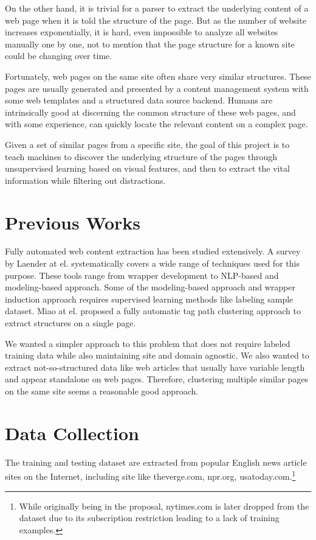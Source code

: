 \documentclass{acm_proc_article-sp}
\begin{document}
On the other hand, it is trivial for a parser to extract the underlying content of a web page when it is told the structure of the page. But as the number of website increases exponentially, it is hard, even impossible to analyze all websites manually one by one, not to mention that the page structure for a known site could be changing over time. 

Fortunately, web pages on the same site often share very similar structures. These pages are usually generated and presented by a content management system with some web templates and a structured data source backend. Humans are intrinsically good at discerning the common structure of these web pages, and with some experience, can quickly locate the relevant content on a complex page.

Given a set of similar pages from a specific site, the goal of this project is to teach machines to discover the underlying structure of the pages through unsupervised learning based on visual features, and then to extract the vital information while filtering out distractions.

\section{Previous Works}

Fully automated web content extraction has been studied extensively. A survey by Laender at el.\cite{laender:brief} systematically covers a wide range of techniques used for this purpose. These tools range from wrapper development to NLP-based and modeling-based approach. Some of the modeling-based approach and wrapper induction approach requires supervised learning methods like labeling sample dataset. Miao at el.\cite{gengxin:extracting} proposed a fully automatic tag path clustering approach to extract structures on a single page.

We wanted a simpler approach to this problem that does not require labeled training data while also maintaining site and domain agnostic. We also wanted to extract not-so-structured data like web articles that usually have variable length and appear standalone on web pages. Therefore, clustering multiple similar pages on the same site seems a reasonable good approach.

\section{Data Collection}

The training and testing dataset are extracted from popular English news article sites on the Internet, including site like theverge.com, npr.org, usatoday.com.\footnote{While originally being in the proposal, nytimes.com is later dropped from the dataset due to its subscription restriction leading to a lack of training examples.}
\end{document}

